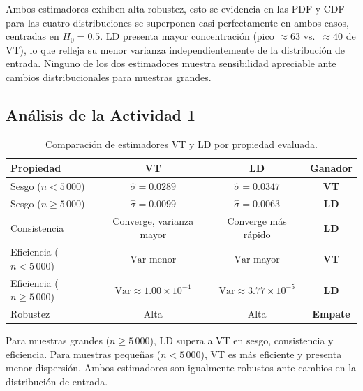 Ambos estimadores exhiben alta robustez, esto se evidencia en las PDF y CDF para las cuatro
distribuciones se superponen casi perfectamente en ambos casos, centradas en
$H_0 = 0.5$. LD presenta mayor concentración (pico $\approx 63$ vs.\
$\approx 40$ de VT), lo que refleja su menor varianza independientemente de
la distribución de entrada. Ninguno de los dos estimadores muestra
sensibilidad apreciable ante cambios distribucionales para muestras grandes.

\subsection{Análisis de la Actividad 1}

\begin{table}[H]
\centering
\caption{Comparación de estimadores VT y LD por propiedad evaluada.}
\label{tab:resumen}
\renewcommand{\arraystretch}{1.3}
\begin{tabular}{lccc}
\toprule
\textbf{Propiedad} & \textbf{VT} & \textbf{LD} & \textbf{Ganador} \\
\midrule
Sesgo ($n < 5\,000$)         & $\hat{\sigma} = 0.0289$ & $\hat{\sigma} = 0.0347$ & \textbf{VT} \\
Sesgo ($n \geq 5\,000$)      & $\hat{\sigma} = 0.0099$ & $\hat{\sigma} = 0.0063$ & \textbf{LD} \\
Consistencia                 & Converge, varianza mayor  & Converge más rápido     & \textbf{LD} \\
Eficiencia ($n < 5\,000$)    & $\text{Var}$ menor        & $\text{Var}$ mayor      & \textbf{VT} \\
Eficiencia ($n \geq 5\,000$) & $\text{Var}\approx1.00\times10^{-4}$ & $\text{Var}\approx3.77\times10^{-5}$ & \textbf{LD} \\
Robustez                     & Alta                      & Alta                    & \textbf{Empate} \\
\bottomrule
\end{tabular}
\end{table}

Para muestras grandes ($n \geq 5\,000$), LD supera a VT en sesgo,
consistencia y eficiencia. Para muestras pequeñas ($n < 5\,000$), VT es más
eficiente y presenta menor dispersión. Ambos estimadores son igualmente
robustos ante cambios en la distribución de entrada.
